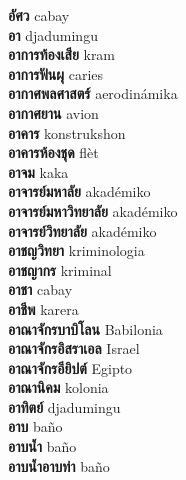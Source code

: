 \textbf{ อัศว  } cabay \\
\textbf{ อา  } djadumingu \\
\textbf{ อาการท้องเสีย  } kram \\
\textbf{ อาการฟันผุ  } caries \\
\textbf{ อากาศพลศาสตร์  } aerodinámika \\
\textbf{ อากาศยาน  } avion \\
\textbf{ อาคาร  } konstrukshon \\
\textbf{ อาคารห้องชุด  } flèt \\
\textbf{ อาจม  } kaka \\
\textbf{ อาจารย์มหาลัย  } akadémiko \\
\textbf{ อาจารย์มหาวิทยาลัย  } akadémiko \\
\textbf{ อาจารย์วิทยาลัย  } akadémiko \\
\textbf{ อาชญวิทยา  } kriminologia \\
\textbf{ อาชญากร  } kriminal \\
\textbf{ อาชา  } cabay \\
\textbf{ อาชีพ  } karera \\
\textbf{ อาณาจักรบาบิโลน  } Babilonia \\
\textbf{ อาณาจักรอิสราเอล  } Israel \\
\textbf{ อาณาจักรอียิปต์  } Egipto \\
\textbf{ อาณานิคม  } kolonia \\
\textbf{ อาทิตย์  } djadumingu \\
\textbf{ อาบ  } baño \\
\textbf{ อาบน้ำ  } baño \\
\textbf{ อาบน้ำอาบท่า  } baño \\
